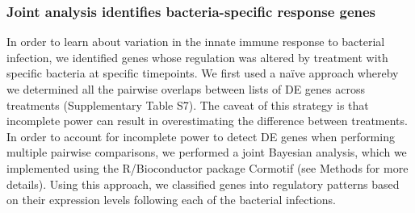 \subsubsection{Joint analysis identifies bacteria-specific response
genes}\label{joint-analysis-identifies-bacteria-specific-response-genes}

In order to learn about variation in the innate immune response to
bacterial infection, we identified genes whose regulation was altered by
treatment with specific bacteria at specific timepoints. We first used a
naïve approach whereby we determined all the pairwise overlaps between
lists of DE genes across treatments (Supplementary Table S7). The caveat
of this strategy is that incomplete power can result in overestimating
the difference between treatments. In order to account for incomplete
power to detect DE genes when performing multiple pairwise comparisons,
we performed a joint Bayesian analysis, which we implemented using the
R/Bioconductor package Cormotif \citep{Wei2015} (see Methods for more
details). Using this approach, we classified genes into regulatory
patterns based on their expression levels following each of the
bacterial infections.

